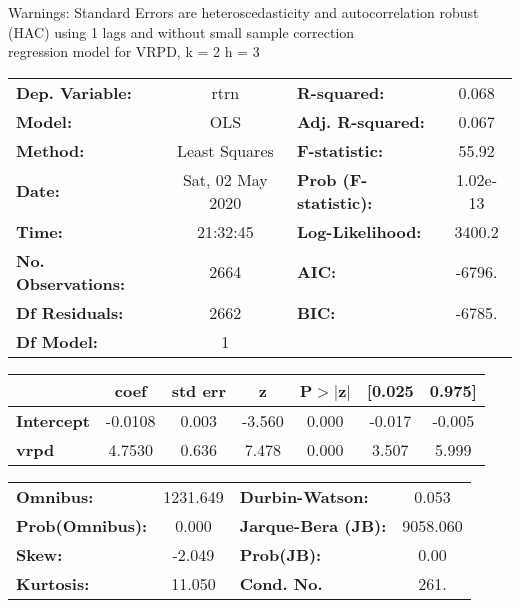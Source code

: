 Warnings: \newline
 [1] Standard Errors are heteroscedasticity and autocorrelation robust (HAC) using 1 lags and without small sample correction\\ 

regression model for VRPD, k = 2 h = 3\begin{center}
\begin{tabular}{lclc}
\toprule
\textbf{Dep. Variable:}    &       rtrn       & \textbf{  R-squared:         } &     0.068   \\
\textbf{Model:}            &       OLS        & \textbf{  Adj. R-squared:    } &     0.067   \\
\textbf{Method:}           &  Least Squares   & \textbf{  F-statistic:       } &     55.92   \\
\textbf{Date:}             & Sat, 02 May 2020 & \textbf{  Prob (F-statistic):} &  1.02e-13   \\
\textbf{Time:}             &     21:32:45     & \textbf{  Log-Likelihood:    } &    3400.2   \\
\textbf{No. Observations:} &        2664      & \textbf{  AIC:               } &    -6796.   \\
\textbf{Df Residuals:}     &        2662      & \textbf{  BIC:               } &    -6785.   \\
\textbf{Df Model:}         &           1      & \textbf{                     } &             \\
\bottomrule
\end{tabular}
\begin{tabular}{lcccccc}
                   & \textbf{coef} & \textbf{std err} & \textbf{z} & \textbf{P$> |$z$|$} & \textbf{[0.025} & \textbf{0.975]}  \\
\midrule
\textbf{Intercept} &      -0.0108  &        0.003     &    -3.560  &         0.000        &       -0.017    &       -0.005     \\
\textbf{vrpd}      &       4.7530  &        0.636     &     7.478  &         0.000        &        3.507    &        5.999     \\
\bottomrule
\end{tabular}
\begin{tabular}{lclc}
\textbf{Omnibus:}       & 1231.649 & \textbf{  Durbin-Watson:     } &    0.053  \\
\textbf{Prob(Omnibus):} &   0.000  & \textbf{  Jarque-Bera (JB):  } & 9058.060  \\
\textbf{Skew:}          &  -2.049  & \textbf{  Prob(JB):          } &     0.00  \\
\textbf{Kurtosis:}      &  11.050  & \textbf{  Cond. No.          } &     261.  \\
\bottomrule
\end{tabular}
\end{center}

